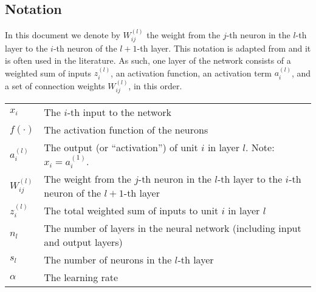 \documentclass{article}
\begin{document}
\subsection{Notation}

In this document we denote by $W_{ij}^{(l)}$ the weight from the $j$-th neuron in the $l$-th layer to the $i$-th neuron of the $l+1$-th layer. This notation is adapted from  \cite{ufldl} and it is often used in the literature. As such, one layer of the network consists of a weighted sum of inputs $z_i^{(l)}$, an activation function, an activation term $a_i^{(l)}$, and a set of connection weights $W_{ij}^{(l)}$, in this order.

\begin{table}[ht]
\begin{tabular}{l|p{10cm}}
$x_i$ & The $i$-th input to the network \\
$f(\cdot)$ & The activation function of the neurons \\
$a_i^{(l)}$ & The output (or ``activation'') of unit $i$ in layer $l$. Note: $x_i = a_i^{(1)}$. \\
$W_{ij}^{(l)}$ & The weight from the $j$-th neuron in the $l$-th layer to the $i$-th \newline neuron of the $l+1$-th layer \\
$z_i^{(l)}$ & The total weighted sum of inputs to unit $i$ in layer $l$ \\
$n_l$ & The number of layers in the neural network (including input and output layers) \\
$s_l$ & The number of neurons in the $l$-th layer \\
$\alpha$ & The learning rate
\end{tabular}
\end{table}
\end{document}
